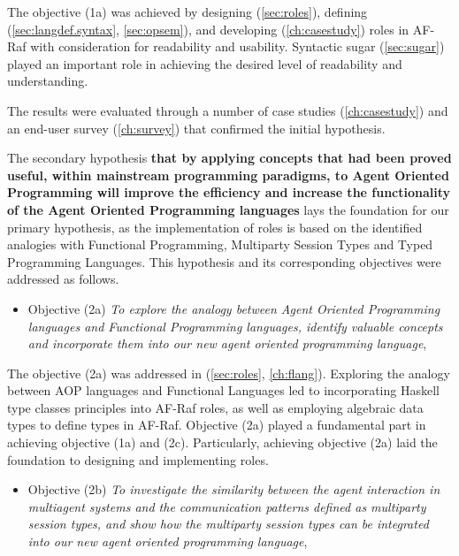 \documentclass[a4paper,12pt,oneside,fleqn]{book} %
\begin{document}
The objective (1a) was achieved by designing (\autoref{sec:roles}),
defining (\autoref{sec:langdef.syntax}, \autoref{sec:opsem}), and
developing (\autoref{ch:casestudy}) roles in AF-Raf with consideration for
readability and usability. Syntactic sugar (\autoref{sec:sugar}) played an
important role in achieving the desired level of readability and
understanding.

The results were evaluated through a number of case
studies (\autoref{ch:casestudy}) and an end-user
survey (\autoref{ch:survey}) that confirmed the initial hypothesis.

The secondary hypothesis \textbf{that by applying concepts
that had been proved useful, within mainstream programming paradigms, to
Agent Oriented Programming will improve the efficiency and increase
the functionality of the Agent Oriented Programming languages} lays the
foundation for our primary hypothesis, as the implementation of roles is
based on the identified analogies with Functional Programming, Multiparty
Session Types and Typed Programming Languages. This hypothesis and its
corresponding objectives were addressed as follows.

\begin{itemize}
  \item Objective (2a) \textit{To explore the analogy between Agent
    Oriented Programming languages and Functional Programming languages,
    identify valuable concepts and incorporate them into our new agent
  oriented programming language}, 
\end{itemize}
  
The objective (2a) was addressed in (\autoref{sec:roles},
\autoref{ch:flang}). Exploring the analogy between AOP languages and
Functional Languages led to incorporating Haskell type classes principles
into AF-Raf roles, as well as employing algebraic data types to define
types in AF-Raf. Objective (2a) played a fundamental part in achieving
objective (1a) and (2c). Particularly, achieving objective (2a) laid the
foundation to designing and implementing roles. 

\begin{itemize}
\item Objective (2b) \textit{To investigate the similarity between
    the agent interaction in multiagent systems and the communication
    patterns defined as multiparty session types, and show how the
    multiparty session types can be integrated into our new agent oriented
  programming language},
\end{itemize}
  
\end{document}
